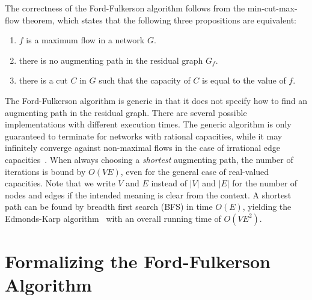 \documentclass[smallcondensed]{svjour3}     %
\newcommand{\isai}{\lstinline[language=isabelle,basicstyle=\normalsize\ttfamily\slshape]}
\begin{document}
The correctness of the Ford-Fulkerson algorithm follows from the min-cut-max-flow theorem, which states that the following three propositions are equivalent:
\begin{enumerate}
\item $f$ is a maximum flow in a network $G$.
\item there is no augmenting path in the residual graph $G_f$.
\item there is a cut $C$ in $G$ such that the capacity of $C$ is equal to the value of $f$.
\end{enumerate}

The Ford-Fulkerson algorithm is generic in that it does not specify how to find an augmenting path in the residual graph. There are several possible implementations with different execution times. The generic algorithm is only guaranteed to terminate for networks with rational capacities, while it may infinitely converge against non-maximal flows in the case of irrational edge capacities~\cite{FF56,Zwick95}. When always choosing a \emph{shortest} augmenting path, the number of iterations is bound by $O(VE)$, even for the general case of real-valued capacities. Note that we write $V$ and $E$ instead of $|V|$ and $|E|$ for the number of nodes and edges if the intended meaning is clear from the context.
A shortest path can be found by breadth first search (BFS) in time $O(E)$, yielding the Edmonds-Karp algorithm~\cite{EK72} with an overall running time of $O(VE^2)$. 


\section{Formalizing the Ford-Fulkerson Algorithm}\label{sec:abs-formalization}
%
%    
%      
%    
%    
\end{document}
